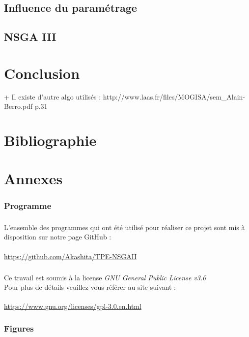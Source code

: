 \documentclass[12pt]{report}
\begin{document}
    \section{Influence du paramétrage}
    \section{NSGA III}


  \chapter{Conclusion}
   + Il existe d'autre algo utilisés : http://www.laas.fr/files/MOGISA/sem_Alain-Berro.pdf p.31
  \appendix

  \chapter{Bibliographie}
  \nocite{*} %
  
  

  \chapter{Annexes}
    \subsection{Programme}
      \paragraph{}
      L'ensemble des programmes qui ont été utilisé pour réaliser ce projet sont mis à disposition sur notre page GitHub : \\\\
      \url{https://github.com/Akashita/TPE-NSGAII}

      \paragraph{}
      Ce travail est soumis à la license \emph{GNU General Public License v3.0}\\ %
      Pour plus de détails veuillez vous référer au site suivant : \\\\
      \url{https://www.gnu.org/licenses/gpl-3.0.en.html}

    \subsection{Figures}
\end{document}
